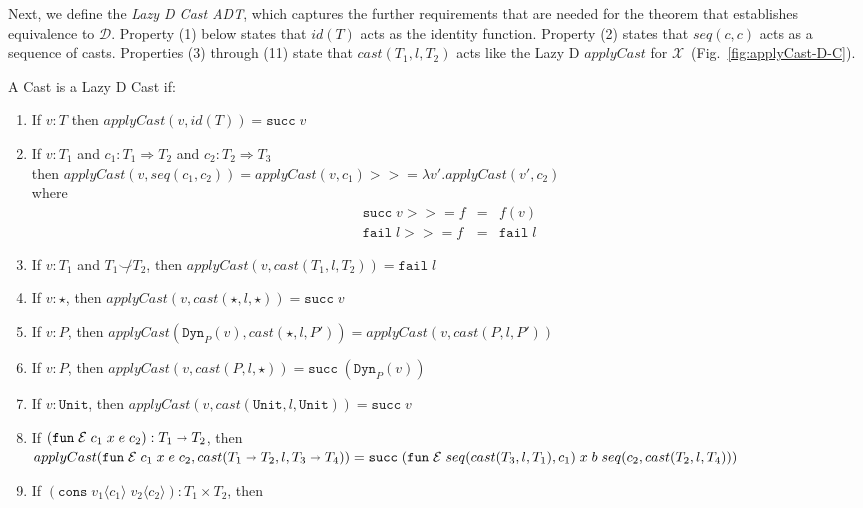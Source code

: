 \documentclass[acmsmall,review,anonymous]{acmart}\settopmatter{printfolios=true,printccs=false,printacmref=false}
\newcommand{\judgeType}[2]{#1 : #2}
\newcommand{\judgeTypeFT}[3]{#1 : #2 \Longrightarrow #3} %
\newcommand{\TOOdyn}[0]{\star}
\newcommand{\POOunit}[0]{\mathtt{Unit}}
\newcommand{\POOfun}[2]{#1 \shortrightarrow #2}
\newcommand{\POOprod}[2]{#1 \times #2}
\newcommand{\rOOsucc}[1]{\mathtt{succ}\;#1}
\newcommand{\rOOfail}[1]{\mathtt{fail}\;#1}
\newcommand{\hcvOOinj}[2]{\mathtt{Dyn}_{#1}(#2)}
\newcommand{\hcvOOfun}[5]{\mathtt{fun} \; #2 \; #1 \; #3 \; #4 \; #5}
\newcommand{\hcvOOcons}[4]{\mathtt{cons}\;#1\langle#2\rangle\;#3\langle#4\rangle}
\newcommand{\ineffCEK}{\ensuremath{\mathcal{X}}}
\newcommand{\ineffCEKD}{\ensuremath{\mathcal{D}}}
\begin{document}
Next, we define the \emph{Lazy D Cast ADT}, which captures the further
requirements that are needed for the theorem that establishes
equivalence to \ineffCEKD{}. Property (1) below states that $id(T)$
acts as the identity function. Property (2) states that $seq(c,c)$
acts as a sequence of casts. Properties (3) through (11) state that
$cast(T_1,l,T_2)$ acts like the Lazy D $applyCast$ for \ineffCEK\
(Fig.~\ref{fig:applyCast-D-C}).

\begin{definition}
  \label{def:surely-lazyd}
  A  Cast is a Lazy D Cast if:
  \begin{enumerate}
  \item If $v : T$ then $applyCast(v,id(T)) = \mathtt{succ} \; v $
  \item If $\judgeType{v}{T_1}$ and
    $ \judgeTypeFT{c_1}{T_1}{T_2}$ and
    $ \judgeTypeFT{c_2}{T_2}{T_3}$\\
    then $applyCast(v,seq(c_1,c_2)) = 
    applyCast(v,c_1) >>= \lambda v'.applyCast(v',c_2)$\\
    where 
    \[
    \begin{array}{rcl}
      \rOOsucc{v} >>= f & = & f(v) \\
      \rOOfail{l} >>= f & = & \rOOfail{l}
    \end{array}
    \]
  \item If $v : T_1$ and $T_1 \not\smile T_2$,
    then $applyCast(v,cast(T_1, l, T_2)) = \rOOfail{l} $
  \item If $v : \star$,
    then $applyCast(v,cast(\TOOdyn,l,\TOOdyn)) = \rOOsucc{v} $
  \item If $v : P$,
    then $applyCast(\hcvOOinj{P}{v},cast(\star,l,P')) 
    = applyCast(v,cast(P,l,P')) $
  \item If $v : P$,
    then $applyCast(v,cast(P,l,\star)) = \rOOsucc{(\hcvOOinj{P}{v})} $
  \item If $v : \POOunit$,
    then $applyCast(v,cast(\POOunit,l,\POOunit)) = \rOOsucc{v} $
  \item If $(\hcvOOfun{c_1}{\mathcal{E}}{x}{e}{c_2}) : \POOfun{T_1}{T_2}$,
    then\\
    $ 
    applyCast(\hcvOOfun{c_1}{\mathcal{E}}{x}{e}{c_2}, 
    cast(\POOfun{T_1}{T_2},l,\POOfun{T_3}{T_4})) \\
    = 
    \rOOsucc{(\hcvOOfun{seq(cast(T_3,l,T_1),c_1)}{\mathcal{E}}{x}{b}{seq(c_2,cast(T_2,l,T_4))})}$
  \item If $(\hcvOOcons{v_1}{c_1}{v_2}{c_2}) : \POOprod{T_1}{T_2}$,
    then \\

\end{enumerate}
\end{definition}
\end{document}
